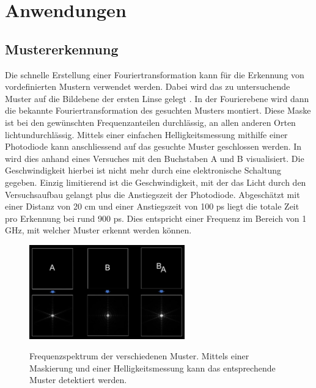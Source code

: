 %
%
%
%
\section{Anwendungen
  \label{opt:section:anwendungen}}

\subsection{Mustererkennung}
Die schnelle Erstellung einer Fouriertransformation kann für die Erkennung von vordefinierten Mustern verwendet werden.
Dabei wird das zu untersuchende Muster auf die Bildebene der ersten Linse gelegt .
In der Fourierebene wird dann die bekannte Fouriertransformation des gesuchten Musters montiert.
Diese Maske ist bei den gewünschten Frequenzanteilen durchlässig, an allen anderen Orten lichtundurchlässig.
Mittels einer einfachen Helligkeitsmessung mithilfe einer Photodiode kann anschliessend auf das gesuchte Muster geschlossen werden.
In \cite{opt:YT:PatternRecognition} wird dies anhand eines Versuches mit den Buchstaben A und B visualisiert.
Die Geschwindigkeit hierbei ist nicht mehr durch eine elektronische Schaltung gegeben.
Einzig limitierend ist die Geschwindigkeit, mit der das Licht durch den Versuchsaufbau gelangt plus die Anstiegszeit der Photodiode.
Abgeschätzt mit einer Distanz von 20 cm und einer Anstiegszeit von 100 ps liegt die totale Zeit pro Erkennung bei rund 900 ps.
Dies entspricht einer Frequenz im Bereich von 1 GHz, mit welcher Muster erkennt werden können.

\begin{figure}
    \centering
    \includegraphics[width=0.6\textwidth]{papers/opt/images/pattern_YT.png}
    \label{opt:fig:patternYT}
    \caption{Frequenzspektrum der verschiedenen Muster. 
    Mittels einer Maskierung und einer Helligkeitsmessung kann das entsprechende Muster detektiert werden.}
\end{figure}

